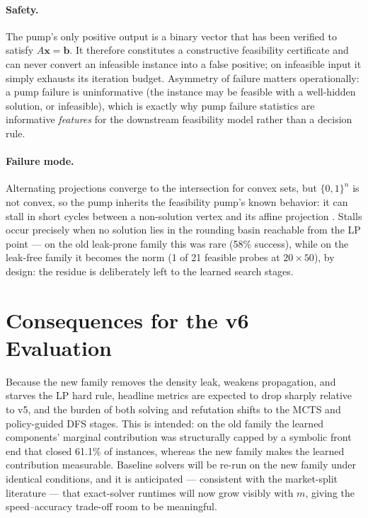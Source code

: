 \documentclass[12pt]{article}
\begin{document}
\paragraph{Safety.} The pump's only positive output is a binary vector that has been verified to satisfy $A\mathbf{x} = \mathbf{b}$. It therefore constitutes a constructive feasibility certificate and can never convert an infeasible instance into a false positive; on infeasible input it simply exhausts its iteration budget. Asymmetry of failure matters operationally: a pump failure is uninformative (the instance may be feasible with a well-hidden solution, or infeasible), which is exactly why pump failure statistics are informative \emph{features} for the downstream feasibility model rather than a decision rule.

\paragraph{Failure mode.} Alternating projections converge to the intersection for convex sets, but $\{0,1\}^n$ is not convex, so the pump inherits the feasibility pump's known behavior: it can stall in short cycles between a non-solution vertex and its affine projection \citep{fischetti2005feasibility}. Stalls occur precisely when no solution lies in the rounding basin reachable from the LP point --- on the old leak-prone family this was rare (58\% success), while on the leak-free family it becomes the norm (1 of 21 feasible probes at $20 \times 50$), by design: the residue is deliberately left to the learned search stages.

\section{Consequences for the v6 Evaluation}

Because the new family removes the density leak, weakens propagation, and starves the LP hard rule, headline metrics are expected to drop sharply relative to v5, and the burden of both solving and refutation shifts to the MCTS and policy-guided DFS stages. This is intended: on the old family the learned components' marginal contribution was structurally capped by a symbolic front end that closed 61.1\% of instances, whereas the new family makes the learned contribution measurable. Baseline solvers will be re-run on the new family under identical conditions, and it is anticipated --- consistent with the market-split literature \citep{aardal2000market, wassermann2025market} --- that exact-solver runtimes will now grow visibly with $m$, giving the speed--accuracy trade-off room to be meaningful.
\end{document}
